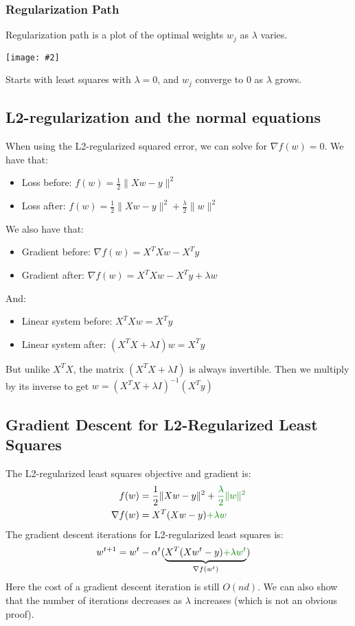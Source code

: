 \documentclass{article}
\def\gre#1{{\color{gre}#1}}
\def\norm#1{\|#1\|}
\newcommand{\centerfig}[2]{\begin{center}\texttt{[image: \#2]}\end{center}}
\begin{document}
\subsubsection*{Regularization Path}
Regularization path is a plot of the optimal weights $ w_j $ as $\lambda$ varies.
\centerfig{0.5}{Reg-path}
Starts with least squares with $\lambda= 0$, and $ w_j $ converge to 0 as $\lambda$ grows.

\subsection*{L2-regularization and the normal equations}

When using the L2-regularized squared error, we can solve for $ \nabla f(w) = 0 $. We have that:
\begin{itemize}
	\item Loss before: $ f(w) = \frac{1}{2} \norm{Xw-y}^2 $
	\item Loss after: $ f(w) = \frac{1}{2} \norm{Xw-y}^2 + \frac{\lambda}{2} \norm{w}^2$
\end{itemize}
We also have that:
\begin{itemize}
	\item Gradient before: $ \nabla f(w) = X^T X w - X^Ty $
	\item Gradient after: $ \nabla f(w) = X^T X w - X^Ty + \lambda w$
\end{itemize}
And:
\begin{itemize}
	\item Linear system before: $ X^TXw = X^Ty $
	\item Linear system after: $ (X^TX + \lambda I )w = X^Ty $
\end{itemize}
But unlike $ X^TX $, the matrix $ (X^TX+ \lambda I) $ is always invertible. Then we multiply by its inverse to get $ w = (X^TX + \lambda I )^{-1} (X^Ty) $

\subsection*{Gradient Descent for L2-Regularized Least Squares}
The L2-regularized least squares objective and gradient is:
\begin{align*}
f(w) &= \frac{1}{2} \norm{Xw - y} ^ 2 + \gre{\frac{\lambda}{2} \norm{w} ^ 2} \\
\nabla f(w) &= X^T (Xw - y) \gre{+ \lambda w}
\end{align*}
The gradient descent iterations for L2-regularized least squares is:
\begin{align*}
w ^ {t+1} &= w^t - \alpha ^ t (\underbrace{X^T (Xw^t - y) \gre{+ \lambda w^t}}_{\nabla f(w^t)})
\end{align*}
Here the cost of a gradient descent iteration is still $ O(nd) $. We can also show that the \gre{number of iterations decreases as $ \lambda $ increases} (which is not an obvious proof).
\end{document}
